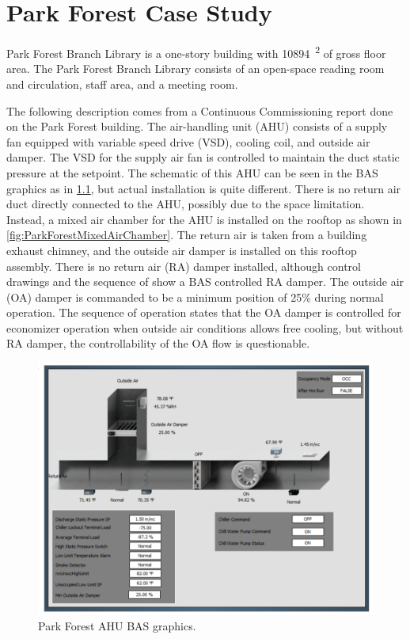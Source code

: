 \chapter{Park Forest Case Study}

Park Forest Branch Library is a one-story building with
\SI{10894}{\feet\squared} of gross floor area. The Park Forest Branch
Library consists of an open-space reading room and circulation, staff
area, and a meeting room.

The following description comes from a Continuous Commissioning report
done on the Park Forest building. The air-handling unit (AHU) consists
of a supply fan equipped with variable speed drive (VSD), cooling coil,
and outside air damper. The VSD for the supply air fan is controlled to
maintain the duct static pressure at the setpoint. The schematic of this AHU can
be seen in the BAS graphics as in \figref{}
\ref{fig:ParkForestAHUGraphic}, but actual installation is
quite different. There is no return air duct directly connected to the
AHU, possibly due to the space limitation. Instead, a mixed air chamber
for the AHU is installed on the rooftop as shown in \figref{}
\ref{fig:ParkForestMixedAirChamber}. The return
air is taken from a building exhaust chimney, and the outside air damper
is installed on this rooftop assembly. There is no return air (RA)
damper installed, although control drawings and the sequence of show a
BAS controlled RA damper. The outside air (OA) damper is commanded to be
a minimum position of 25\% during normal operation. The sequence of
operation states that the OA damper is controlled for economizer
operation when outside air conditions allows free cooling, but without
RA damper, the controllability of the OA flow is questionable.

\begin{figure}
\centering
\includegraphics[width=\textwidth]{Images/ParkForestAHUGraphic.PNG}
\caption{Park Forest AHU BAS graphics.}
\label{fig:ParkForestAHUGraphic}
\end{figure}

